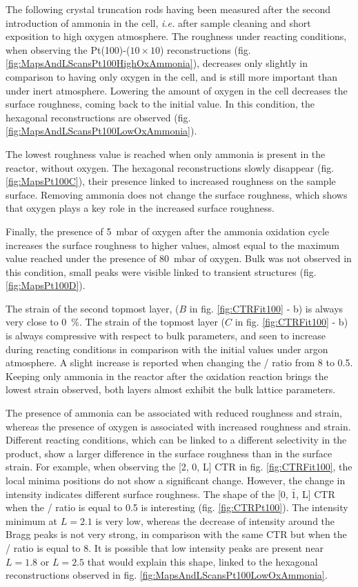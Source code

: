 The following crystal truncation rods having been measured after the second introduction of ammonia in the cell, \textit{i.e.} after sample cleaning and short exposition to high oxygen atmosphere.
The roughness under reacting conditions, when observing the Pt(100)-($10\times10$) reconstructions (fig. \ref{fig:MapsAndLScansPt100HighOxAmmonia}), decreases only slightly in comparison to having only oxygen in the cell, and is still more important than under inert atmosphere.
Lowering the amount of oxygen in the cell decreases the surface roughness, coming back to the initial value.
In this condition, the hexagonal reconstructions are observed (fig. \ref{fig:MapsAndLScansPt100LowOxAmmonia}).

The lowest roughness value is reached when only ammonia is present in the reactor, without oxygen.
The hexagonal reconstructions slowly disappear (fig. \ref{fig:MapsPt100C}), their presence linked to increased roughness on the sample surface.
Removing ammonia does not change the surface roughness, which shows that oxygen plays a key role in the increased surface roughness.

Finally, the presence of \qty{5}{\milli\bar} of oxygen after the ammonia oxidation cycle increases the surface roughness to higher values, almost equal to the maximum value reached under the presence of \qty{80}{\milli\bar} of oxygen.
Bulk  was not observed in this condition, small peaks were visible linked to transient structures (fig. \ref{fig:MapsPt100D}).

The strain of the second topmost layer, ($B$ in fig. \ref{fig:CTRFit100} - b) is always very close to \qty{0}{\percent}.
The strain of the topmost layer ($C$ in fig. \ref{fig:CTRFit100} - b) is always compressive with respect to bulk parameters, and seen to increase during reacting conditions in comparison with the initial values under argon atmosphere.
A slight increase is reported when changing the / ratio from \num{8} to \num{0.5}.
Keeping only ammonia in the reactor after the oxidation reaction brings the lowest strain observed, both layers almost exhibit the bulk lattice parameters.

The presence of ammonia can be associated with reduced roughness and strain, whereas the presence of oxygen is associated with increased roughness and strain.
Different reacting conditions, which can be linked to a different selectivity in the product, show a larger difference in the surface roughness than in the surface strain.
For example, when observing the [2, 0, L] CTR in fig. \ref{fig:CTRFit100}, the local minima positions do not show a significant change.
However, the change in intensity indicates different surface roughness.
The shape of the [0, $\bar{1}$, L] CTR when the / ratio is equal to \num{0.5} is interesting (fig. \ref{fig:CTRPt100}).
The intensity minimum at $L=2.1$ is very low, whereas the decrease of intensity around the Bragg peaks is not very strong, in comparison with the same CTR but when the / ratio is equal to \num{8}.
It is possible that low intensity peaks are present near $L=1.8$ or $L=2.5$ that would explain this shape, linked to the hexagonal reconstructions observed in fig. \ref{fig:MapsAndLScansPt100LowOxAmmonia}.

